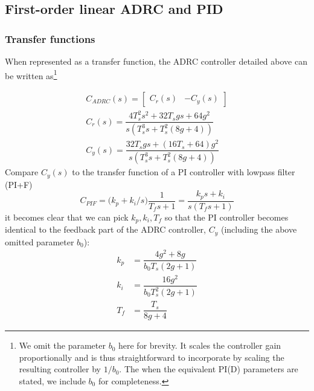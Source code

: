 \documentclass[letterpaper, 10 pt, conference]{ieeeconf}
\newcommand{\bmatrixx}[1]{\begin{bmatrix}#1\end{bmatrix}}
\begin{document}
\subsection{First-order linear ADRC and PID}
\subsubsection{Transfer functions}

When represented as a transfer function, the ADRC controller detailed above can be written as\footnote{We omit the parameter $b_0$ here for brevity. It scales the controller gain proportionally and is thus straightforward to incorporate by scaling the resulting controller by $1/b_0$. The when the equivalent PI(D) parameters are stated, we include $b_0$ for completeness.}




\begin{align}
	C_{ADRC}(s) = \bmatrixx{C_r(s) & -C_y(s)}\\
	C_r(s) = \dfrac{4T_{s}^2s^2 + 32T_{s}gs + 64g^2}{s(T_{s}^3s + T_{s}^2(8g + 4))} \\
	C_y(s) = \dfrac{32T_{s}gs + (16T_{s} + 64)g^2}{s(T_{s}^3s + T_{s}^2(8g + 4))}
\end{align}
 Compare $C_y(s)$ to the transfer function of a PI controller with lowpass filter (PI+F)
$$C_{PIF} = \big(k_p + k_i/s \big)\dfrac{1}{T_f s + 1} = \dfrac{k_p s + k_i}{s(T_f s + 1)}$$
it becomes clear that we can pick $k_p, k_i, T_f$ so that the PI controller becomes identical to the feedback part of the ADRC controller, $C_y$ (including the above omitted parameter $b_0$):
\begin{align}
	k_p &= \dfrac{4 g^2 + 8 g}{b_0 T_s(2 g + 1)} \label{eq:kp}\\
	k_i &= \dfrac{16 g^2}{b_0 T_s^2(2g + 1)} \label{eq:ki}\\
	T_f &= \dfrac{T_s}{8 g + 4} \label{eq:Tf}
\end{align}
\end{document}
